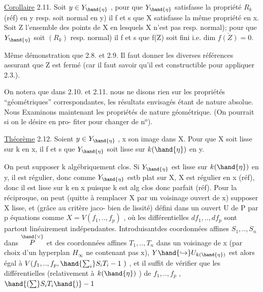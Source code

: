 
\uline{Corollaire} 2.11. Soit $y\in Y_{\hand{\eta}}$ , pour que $Y_{\hand{\eta}}$  satisfasse la propriété
$R_k$ (réf) en y\hand{,} \deleted{(}resp. soit normal en y) il f et s que X satisfasse
la même propriété en x.  Soit Z l'ensemble des points de X en
lesquels X n'est pas resp.  normal); pour que $Y_{\hand{\eta}}$ soit
 $(R_k)$\hand{,} \deleted{(}resp. normal) il f et s que f(Z) soit fini i.e. dim $\overline{f(Z)}=0$.

\margin{|} Même démonstration que 2.8. et 2.9. Il faut donner les diverses
références assurant que Z est fermé (car il faut savoir qu'il est
constructible pour appliquer 2.3.).

 On notera que dans 2.10. et 2.11. nous ne disons rien
sur les propriétés ``géométriques'' correspondantes, les résultats
envisagés étant de nature absolue. Nous Examinons maintenant les
propriétés de nature géométrique. (On pourrait si on le désire en pro-%
\margin{||}fiter pour changer de n$^{\text{o}}$).

\uline{Théorème} 2.12. Soient $y\in Y_{\hand{\eta}}$ , x son image dans X. Pour que X soit
lisse sur k en x, il f et s que $Y_{\hand{\eta}}$ soit lisse sur $k(\hand{\eta})$ en y.

On peut supposer k algébriquement clos. Si $Y_{\hand{\eta}}$ est lisse sur $k(\hand{\eta})$
en y, il est régulier, donc comme $Y_{\hand{\eta}}$ estb plat sur X, X est régulier
en x (réf), donc il est lisse sur k en x puisque k est alg clos donc
parfait (réf). Pour la réciproque, on peut (quitte à remplacer X par
un voisinage ouvert de x) supposer X lisse, et (grâce au critère jaco-%
bien de lissité) défini dans un ouvert U de P par p équations
comme $X=V(f_1,..,f_p)$ , où les différentielles $df_1,..,df_p$ sont
partout linéairement indépendantes. Introduisantdes coordonnées affines
$S_1,..,S_n$ dans $\overset{\hand{\vee}}{P}$ et des coordonnées affines $T_1,..,T_n$ dans un voisinage
de x (par choix d'un hyperplan $H_\infty$ ne contenant pas x), $Y\hand{\hookrightarrow} U_{k(\hand{\eta})}$ est
alors égal à $V(f_1,..,f_p,\hand{\sum_i}S_iT_i-1\ )$ , et il suffit de vérifier que
les différentielles (relativement à $k(\hand{\eta})$ ) de $f_1,..,f_p$ ,$\hand{(\sum}S_iT_i\hand{)}-1$

